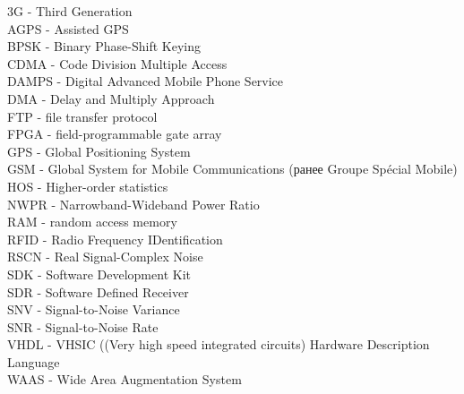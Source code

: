 \noindent
3G - Third Generation						\\
AGPS - Assisted GPS						\\
BPSK - Binary Phase-Shift Keying				\\
CDMA - Code Division Multiple Access				\\
DAMPS - Digital Advanced Mobile Phone Service			\\
DMA - Delay and Multiply Approach				\\
FTP - file transfer protocol					\\
FPGA - field-programmable gate array 				\\
GPS - Global Positioning System					\\
GSM - Global System for Mobile Communications (ранее Groupe Spécial Mobile) \\
HOS - Higher-order statistics					\\
NWPR - Narrowband-Wideband Power Ratio				\\
RAM - random access memory					\\
RFID - Radio Frequency IDentification				\\
RSCN - Real Signal-Complex Noise				\\
SDK - Software Development Kit					\\
SDR - Software Defined Receiver					\\
SNV - Signal-to-Noise Variance					\\
SNR - Signal-to-Noise Rate					\\
VHDL - VHSIC ((Very high speed integrated circuits) Hardware Description Language			\\
WAAS - Wide Area Augmentation System				\\


\newpage
